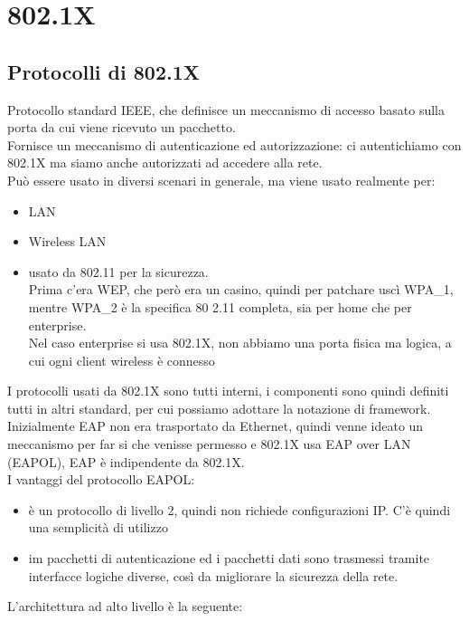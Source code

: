 \documentclass[12pt, oneside]{extbook} %
\begin{document}
\chapter*{802.1X}

\section{Protocolli di 802.1X}
Protocollo standard IEEE, che definisce un meccanismo di accesso basato sulla porta da cui viene ricevuto un pacchetto.
\\Fornisce un meccanismo di autenticazione ed autorizzazione: ci autentichiamo con 802.1X ma siamo anche autorizzati ad accedere alla rete.
\\Può essere usato in diversi scenari in generale, ma viene usato realmente per:
    \begin{itemize}
        \item LAN
        \item Wireless LAN
        \item usato da 802.11 per la sicurezza.
        \\Prima c'era WEP, che però era un casino, quindi per patchare uscì WPA\_1, mentre WPA\_2 è la specifica 80         2.11 completa, sia per home che per enterprise.
        \\Nel caso enterprise si usa 802.1X, non abbiamo una porta fisica ma logica, a cui ogni client wireless è connesso
    \end{itemize}
I protocolli usati da 802.1X sono tutti interni, i componenti sono quindi definiti tutti in altri standard, per cui possiamo adottare la notazione di framework.
\\Inizialmente EAP non era trasportato da Ethernet, quindi venne ideato un meccanismo per far si che venisse permesso e 802.1X usa EAP over LAN (EAPOL), EAP è indipendente da 802.1X.
\\I vantaggi del protocollo EAPOL:
    \begin{itemize}
        \item è un protocollo di livello 2, quindi non richiede configurazioni IP. C'è quindi una semplicità di utilizzo
        \item im pacchetti di autenticazione ed i pacchetti dati sono trasmessi tramite interfacce logiche diverse, così da migliorare la sicurezza della rete.
    \end{itemize}
L'architettura ad alto livello è la seguente:\\
\end{document}
